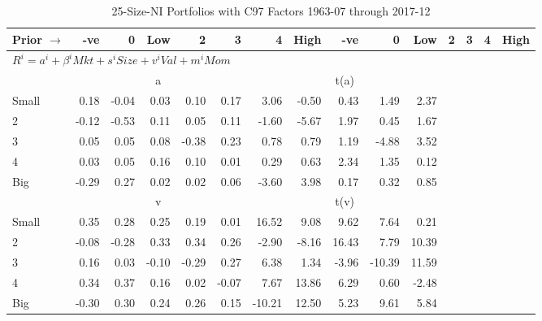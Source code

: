 
\begin{table}[!ht]
\footnotesize
\centering
\caption{25-Size-NI Portfolios with C97 Factors 1963-07 through 2017-12}
\begin{tabular}{lrrrrrrrrrrrrrr}
  \toprule
    Prior $\rightarrow$ & -ve & 0 & Low & 2 & 3 & 4 & High & -ve & 0 & Low & 2 & 3 & 4 & High \\ 
  \midrule
  \multicolumn{11}{l}{$R^i=a^i+\beta^iMkt+s^iSize+v^iVal+m^iMom$} \\

  
    
      & \multicolumn{5}{c}{a} & \multicolumn{5}{c}{t(a)}
    
    \\
      \cmidrule(r){2-6} \cmidrule(r){7-11}

    Small   & 0.18  & -0.04  & 0.03  & 0.10  & 0.17  & 3.06  & -0.50  & 0.43  & 1.49  & 2.37  \\
         2  & -0.12  & -0.53  & 0.11  & 0.05  & 0.11  & -1.60  & -5.67  & 1.97  & 0.45  & 1.67  \\
         3  & 0.05  & 0.05  & 0.08  & -0.38  & 0.23  & 0.78  & 0.79  & 1.19  & -4.88  & 3.52  \\
         4  & 0.03  & 0.05  & 0.16  & 0.10  & 0.01  & 0.29  & 0.63  & 2.34  & 1.35  & 0.12  \\
    Big     & -0.29  & 0.27  & 0.02  & 0.02  & 0.06  & -3.60  & 3.98  & 0.17  & 0.32  & 0.85  \\

  
    
      & \multicolumn{5}{c}{v} & \multicolumn{5}{c}{t(v)}
    
    \\
      \cmidrule(r){2-6} \cmidrule(r){7-11}

    Small   & 0.35  & 0.28  & 0.25  & 0.19  & 0.01  & 16.52  & 9.08  & 9.62  & 7.64  & 0.21  \\
         2  & -0.08  & -0.28  & 0.33  & 0.34  & 0.26  & -2.90  & -8.16  & 16.43  & 7.79  & 10.39  \\
         3  & 0.16  & 0.03  & -0.10  & -0.29  & 0.27  & 6.38  & 1.34  & -3.96  & -10.39  & 11.59  \\
         4  & 0.34  & 0.37  & 0.16  & 0.02  & -0.07  & 7.67  & 13.86  & 6.29  & 0.60  & -2.48  \\
    Big     & -0.30  & 0.30  & 0.24  & 0.26  & 0.15  & -10.21  & 12.50  & 5.23  & 9.61  & 5.84  \\

  
    

\end{tabular}
\end{table}
